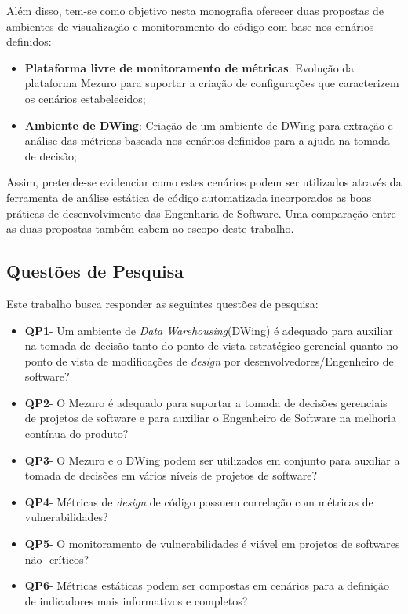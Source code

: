 %

Além disso, tem-se como objetivo nesta monografia oferecer duas propostas de ambientes de visualização e monitoramento do código com base nos cenários definidos:
\begin{itemize}
\item \textbf{Plataforma livre de monitoramento de métricas}: Evolução da plataforma Mezuro para suportar a criação de configurações que caracterizem os cenários estabelecidos;
\item \textbf{Ambiente de DWing}: Criação de um ambiente de DWing para extração e análise das métricas baseada nos cenários definidos para a ajuda na tomada de decisão;
\end{itemize}

Assim, pretende-se evidenciar como estes cenários podem ser utilizados através da ferramenta de análise estática de código automatizada incorporados as boas práticas de desenvolvimento das Engenharia de Software. Uma comparação entre as duas propostas também cabem ao escopo deste trabalho.

%

\subsection{Questões de Pesquisa}

%

Este trabalho busca responder as seguintes questões de pesquisa:

%

\begin{itemize}
\item \textbf{QP1}- Um ambiente de \emph{Data Warehousing}(DWing) é  adequado para auxiliar na tomada de decisão tanto do ponto de vista estratégico gerencial quanto no ponto de vista de modificações de \emph{design} por desenvolvedores/Engenheiro de software?
\item \textbf{QP2}- O Mezuro é adequado para suportar a tomada de decisões gerenciais de projetos de software e para auxiliar o Engenheiro de Software na melhoria contínua do produto?
\item \textbf{QP3}- O Mezuro e o DWing podem ser utilizados em conjunto para auxiliar a tomada de decisões em vários níveis de projetos de software?
\item \textbf{QP4}- Métricas de \emph{design} de código possuem correlação com métricas de vulnerabilidades?
\item \textbf{QP5}- O monitoramento de vulnerabilidades é viável em projetos de softwares não- críticos?
\item \textbf{QP6}- Métricas estáticas podem ser compostas em cenários para a definição de indicadores mais informativos e completos?
\end{itemize}


